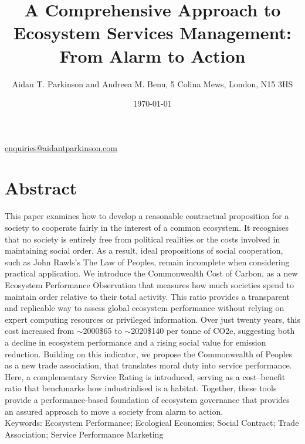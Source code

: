 \documentclass[10pt, oneside]{article}   	%
\title{A Comprehensive Approach to Ecosystem Services Management: From Alarm to Action}
\author{Aidan T. Parkinson and Andreea M. Benu, 5 Colina Mews, London, N15 3HS}
\date{\today}							%
\begin{document}
\maketitle
\begin{center}
\href{mailto:enquiries@aidantparkinson.com}{enquiries@aidantparkinson.com}
\end{center}

\section{Abstract}
This paper examines how to develop a reasonable contractual proposition for a society to cooperate fairly in the interest of a common ecosystem.
It recognises that no society is entirely free from political realities or the costs involved in maintaining social order.
As a result, ideal propositions of social cooperation, such as John Rawls’s The Law of Peoples, remain incomplete when considering practical application.
We introduce the Commonwealth Cost of Carbon, as a new Ecosystem Performance Observation that measures how much societies spend to maintain order relative to their total activity.
This ratio provides a transparent and replicable way to assess global ecosystem performance without relying on expert computing resources or privileged information.
Over just twenty years, this cost increased from $\sim$2000\$65 to $\sim$2020\$140 per tonne of CO2e, suggesting both a decline in ecosystem performance and a rising social value for emission reduction.
Building on this indicator, we propose the Commonwealth of Peoples as a new trade association, that translates moral duty into service performance.
Here, a complementary Service Rating is introduced, serving as a cost–benefit ratio that benchmarks how industrialised is a habitat.
Together, these tools provide a performance-based foundation of ecosystem governance that provides an assured approach to move a society from alarm to action.\\

Keywords: Ecosystem Performance; Ecological Economics; Social Contract; Trade Association; Service Performance Marketing\\
\end{document}
